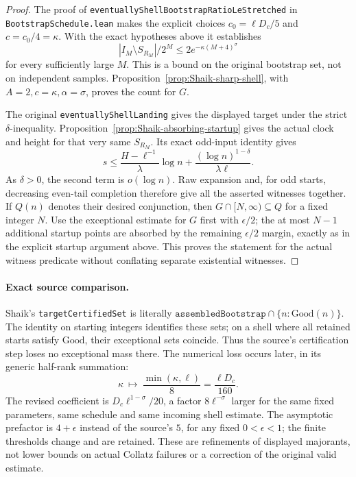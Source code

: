 \begin{proof}
The proof of
\texttt{eventuallyShellBootstrapRatioLeStretched} in
\texttt{BootstrapSchedule.lean} makes the explicit choices
\(c_0=\ell D_c/5\) and \(c=c_0/4=\kappa\).
With the exact hypotheses above it establishes
\[
 |I_M\setminus S_{R_M}|/2^M
 \le2e^{-\kappa(M+4)^\sigma}
\]
for every sufficiently large \(M\).
This is a bound on the original bootstrap set, not on independent
samples. Proposition~\ref{prop:Shaik-sharp-shell}, with
\(A=2,c=\kappa,\alpha=\sigma\), proves the count for \(G\).

The original \texttt{eventuallyShellLanding} gives the displayed
target under the strict \(\delta\)-inequality.
Proposition~\ref{prop:Shaik-absorbing-startup} gives the actual
clock and height for that very same \(S_{R_M}\).
Its exact odd-input identity gives
\[
 s\le\frac{H-\ell^{-1}}{\lambda}\log n+
              \frac{(\log n)^{1-\delta}}{\lambda\ell}.
\]
As \(\delta>0\), the second term is \(o(\log n)\).
Raw expansion and, for odd starts, decreasing even-tail completion
therefore give all the asserted witnesses together.
If \(Q(n)\) denotes their desired conjunction, then
\(G\cap[N,\infty)\subseteq Q\) for a fixed integer \(N\).
Use the exceptional estimate for \(G\) first with \(\epsilon/2\);
the at most \(N-1\) additional startup points are absorbed by the
remaining \(\epsilon/2\) margin, exactly as in the explicit startup
argument above. This proves the statement for the actual witness
predicate without conflating separate existential witnesses.
\end{proof}

\paragraph{Exact source comparison.}
Shaik's \texttt{targetCertifiedSet} is literally
\(\texttt{assembledBootstrap}\cap\{n:\mathrm{Good}(n)\}\).
The identity on starting integers identifies these sets; on a shell
where all retained starts satisfy \(\mathrm{Good}\), their exceptional
sets coincide. Thus the source's certification step loses no
exceptional mass there. The numerical loss occurs later, in its
generic half-rank summation:
\[
 \kappa\ \longmapsto\ \frac{\min(\kappa,\ell)}8
        =\frac{\ell D_c}{160}.
\]
The revised coefficient is \(D_c\ell^{1-\sigma}/20\), a factor
\(8\ell^{-\sigma}\) larger for the same fixed parameters, same
schedule and same incoming shell estimate. The asymptotic prefactor
is \(4+\epsilon\) instead of the source's \(5\), for any fixed
\(0<\epsilon<1\); the finite thresholds change and are retained.
These are refinements of displayed majorants, not lower bounds on
actual Collatz failures or a correction of the original valid estimate.

